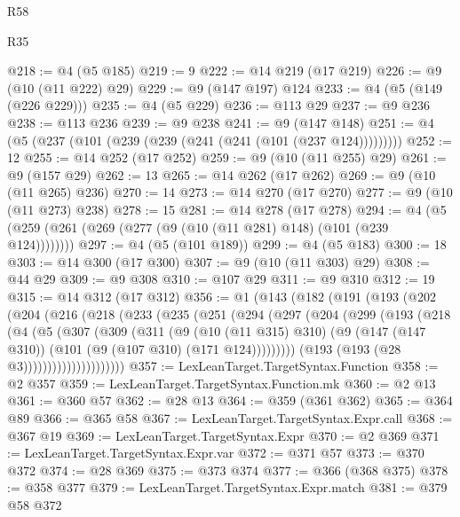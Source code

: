 \begin{lexlean}{R58}
\begin{lexlean}{R35}
\begin{coremodule}
{{{{{{{{{{{{{{{{{{{{{{{{{{{{{{{{{{{{{{{{{{{{{{{{{{{{@218 := @4 (@5 @185)
@219 := 9
@222 := @14 @219 (@17 @219)
@226 := @9 (@10 (@11 @222) @29)
@229 := @9 (@147 @197) @124
@233 := @4 (@5 (@149 (@226 @229)))
@235 := @4 (@5 @229)
@236 := @113 @29
@237 := @9 @236
@238 := @113 @236
@239 := @9 @238
@241 := @9 (@147 @148)
@251 := @4 (@5 (@237 (@101 (@239 (@239 (@241 (@241 (@101 (@237 @124)))))))))
@252 := 12
@255 := @14 @252 (@17 @252)
@259 := @9 (@10 (@11 @255) @29)
@261 := @9 (@157 @29)
@262 := 13
@265 := @14 @262 (@17 @262)
@269 := @9 (@10 (@11 @265) @236)
@270 := 14
@273 := @14 @270 (@17 @270)
@277 := @9 (@10 (@11 @273) @238)
@278 := 15
@281 := @14 @278 (@17 @278)
@294 := @4 (@5 (@259 (@261 (@269 (@277 (@9 (@10 (@11 @281) @148) (@101 (@239 @124))))))))
@297 := @4 (@5 (@101 @189))
@299 := @4 (@5 @183)
@300 := 18
@303 := @14 @300 (@17 @300)
@307 := @9 (@10 (@11 @303) @29)
@308 := @44 @29
@309 := @9 @308
@310 := @107 @29
@311 := @9 @310
@312 := 19
@315 := @14 @312 (@17 @312)
@356 := @1
    (@143
      (@182
        (@191
          (@193
            (@202
              (@204
                (@216
                  (@218
                    (@233
                      (@235
                        (@251
                          (@294
                            (@297
                              (@204
                                (@299
                                  (@193
                                    (@218
                                      (@4
                                        (@5
                                          (@307
                                            (@309
                                              (@311
                                                (@9
                                                  (@10 (@11 @315) @310)
                                                  (@9
                                                    (@147 (@147 @310))
                                                    (@101 (@9 (@107 @310) (@171 @124)))))))))
                                        (@193 (@193 (@28 @3)))))))))))))))))))))
@357 := LexLeanTarget.TargetSyntax.Function
@358 := @2 @357
@359 := LexLeanTarget.TargetSyntax.Function.mk
@360 := @2 @13
@361 := @360 @57
@362 := @28 @13
@364 := @359 (@361 @362)
@365 := @364 @89
@366 := @365 @58
@367 := LexLeanTarget.TargetSyntax.Expr.call
@368 := @367 @19
@369 := LexLeanTarget.TargetSyntax.Expr
@370 := @2 @369
@371 := LexLeanTarget.TargetSyntax.Expr.var
@372 := @371 @57
@373 := @370 @372
@374 := @28 @369
@375 := @373 @374
@377 := @366 (@368 @375)
@378 := @358 @377
@379 := LexLeanTarget.TargetSyntax.Expr.match
@381 := @379 @58 @372
}}}}}}}}}}}}}}}}}}}}}}}}}}}}}}}}}}}}}}}}}}}}}}}}}}}}
\end{coremodule}
\end{lexlean}
\end{lexlean}

